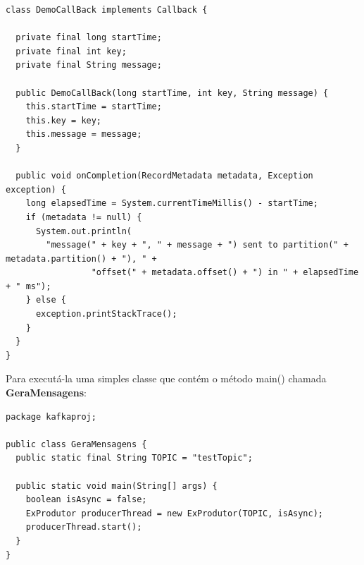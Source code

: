 \documentclass[a4paper,11pt]{article}
\begin{document}
\begin{lstlisting}[]
class DemoCallBack implements Callback {
 
  private final long startTime;
  private final int key;
  private final String message;
 
  public DemoCallBack(long startTime, int key, String message) {
    this.startTime = startTime;
    this.key = key;
    this.message = message;
  }
 
  public void onCompletion(RecordMetadata metadata, Exception exception) {
    long elapsedTime = System.currentTimeMillis() - startTime;
    if (metadata != null) {
      System.out.println(
        "message(" + key + ", " + message + ") sent to partition(" + metadata.partition() + "), " +
                 "offset(" + metadata.offset() + ") in " + elapsedTime + " ms");
    } else {
      exception.printStackTrace();
    }
  }
}
\end{lstlisting}

Para executá-la uma simples classe que contém o método main() chamada \textbf{GeraMensagens}:
\begin{lstlisting}[]
package kafkaproj;

public class GeraMensagens {
  public static final String TOPIC = "testTopic";
   
  public static void main(String[] args) {
    boolean isAsync = false;
    ExProdutor producerThread = new ExProdutor(TOPIC, isAsync);
    producerThread.start();
  }
}
\end{lstlisting}
\end{document}
